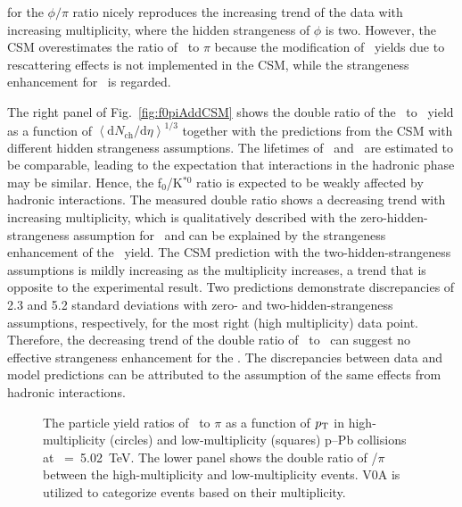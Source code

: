 for the $\phi/\pi$ ratio nicely reproduces the increasing trend of the data with increasing multiplicity, where the hidden strangeness of $\phi$ is two. However, the CSM overestimates the ratio of \kstar~to $\pi$ because the modification of \kstar~yields due to rescattering effects is not implemented in the CSM, while the strangeness enhancement for \kstar~is regarded.

The right panel of Fig.~\ref{fig:f0piAddCSM} shows the double ratio of the \fzero~to \kstar~yield as a function of $\left\langle \mathrm{d}N_{\mathrm{ch}}/\mathrm{d}\eta \right\rangle^{1/3}$ together with the predictions from the CSM with different hidden strangeness assumptions. The lifetimes of \fzero~and \kstar~are estimated to be comparable, leading to the expectation that interactions in the hadronic phase may be similar. Hence, the f$_{0}$/K$^{*0}$ ratio is expected to be weakly affected by hadronic interactions. The measured double ratio shows a decreasing trend with increasing multiplicity, which is qualitatively described with the zero-hidden-strangeness assumption for \fzero~and can be explained by the strangeness enhancement of the \kstar~yield. The CSM prediction with the two-hidden-strangeness assumptions is mildly increasing as the multiplicity increases, a trend that is opposite to the experimental result. Two predictions demonstrate discrepancies of 2.3 and 5.2 standard deviations with zero- and two-hidden-strangeness assumptions, respectively, for the most right (high multiplicity) data point. Therefore, the decreasing trend of the double ratio of \fzero~to \kstar~can suggest no effective strangeness enhancement for the \fzero. The discrepancies between data and model predictions can be attributed to the assumption of the same effects from hadronic interactions.  

\begin{figure}[!hbt]
	\centering
	\caption{ The particle yield ratios of \fzero~to $\pi$ as a function of $p_{\rm{T}}$ in high-multiplicity (circles) and low-multiplicity (squares) p--Pb collisions at \snn~=~5.02~TeV. The lower panel shows the double ratio of \fzero/$\pi$ between the high-multiplicity and low-multiplicity events. V0A is utilized to categorize events based on their multiplicity.}
	\label{fig:f0piPt}
\end{figure}

